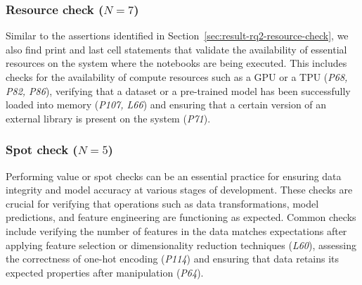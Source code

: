 
\subsubsection{Resource check ($N = 7$)}\label{sec:implicit-resource-check}

Similar to the assertions identified in Section~\ref{sec:result-rq2-resource-check}, we also find print and last cell statements that validate the availability of essential resources on the system where the notebooks are being executed. This includes checks for the availability of compute resources such as a GPU or a TPU (\emph{P68, P82, P86}), verifying that a dataset or a pre-trained model has been successfully loaded into memory (\emph{P107, L66}) and ensuring that a certain version of an external library is present on the system (\emph{P71}).


\subsubsection{Spot check ($N = 5$)}

Performing value or spot checks can be an essential practice for ensuring data integrity and model accuracy at various stages of development. These checks are crucial for verifying that operations such as data transformations, model predictions, and feature engineering are functioning as expected. Common checks include verifying the number of features in the data matches expectations after applying feature selection or dimensionality reduction techniques (\emph{L60}), assessing the correctness of one-hot encoding (\emph{P114}) and ensuring that data retains its expected properties after manipulation (\emph{P64}).

